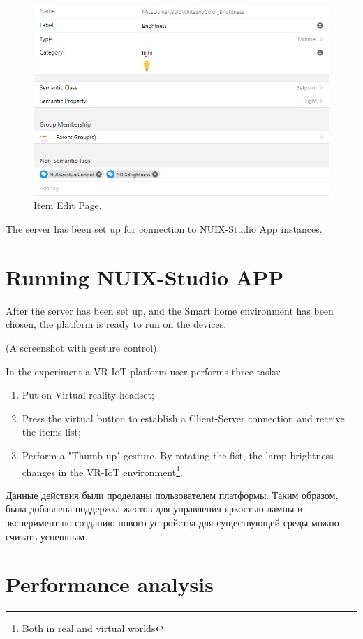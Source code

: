 \begin{figure}
  \centering
  \includegraphics[width=0.9\linewidth]{figures/ItemEditPage.png}
  \caption{Item Edit Page.}
  \label{fig:ItemEditPage-figure}
\end{figure}

The server has been set up for connection to NUIX-Studio App instances.

\section{Running NUIX-Studio APP}

After the server has been set up, and the Smart home environment has been chosen, the platform is ready to run on the devices.

(A screenshot with gesture control).

In the experiment a VR-IoT platform user performs three tasks:
\begin{enumerate}
    \item Put on Virtual reality headset;
    \item Press the virtual button to establish a Client-Server connection and receive the items list;
    \item Perform a "Thumb up" gesture. By rotating the fist, the lamp brightness changes in the VR-IoT environment\footnote{Both in real and virtual worlds}.
\end{enumerate}

Данные действия были проделаны пользователем платформы. Таким образом, была добавлена поддержка жестов для управления яркостью лампы и эксперимент по созданию нового устройства для существующей среды можно считать успешным. 

\section{Performance analysis}

